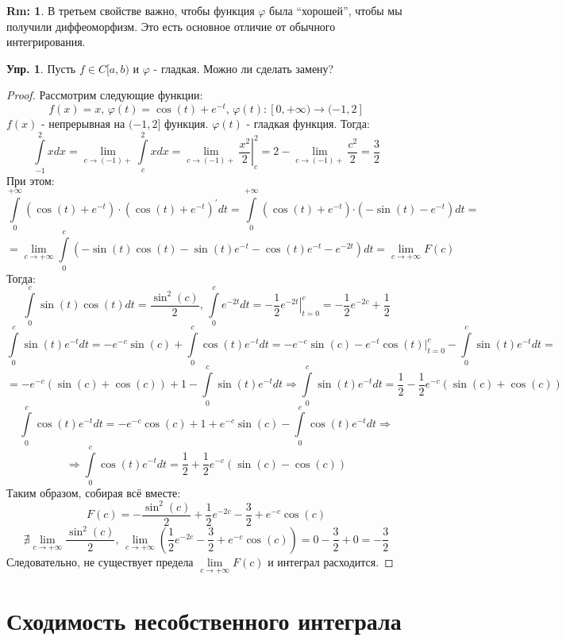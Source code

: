 \documentclass[12pt]{article}
\theoremstyle{definition}
\newtheorem{rem}{Rm:}
\newtheorem{exrc}{Упр.}
\newcommand{\ddint}[2]{\displaystyle\int\limits_{#1}^{#2}}
\begin{document}
\begin{rem}
	В третьем свойстве важно, чтобы функция $\varphi$ была ``хорошей'', чтобы мы получили диффеоморфизм. Это есть основное отличие от обычного интегрирования.
\end{rem}
\begin{exrc}
	Пусть $f \in C[a,b)$ и $\varphi$ - гладкая. Можно ли сделать замену?
\end{exrc}
\begin{proof}
	Рассмотрим следующие функции: 
	$$
		f(x) = x, \, \varphi(t) = \cos{(t)} + e^{-t}, \, \varphi(t) \colon [0,+\infty) \to (-1, 2]
	$$
	$f(x)$ - непрерывная на $(-1,2]$ функция. $\varphi(t)$ - гладкая функция. Тогда:
	$$
		\ddint{-1}{2}xdx = \lim\limits_{c \to (-1)+}\ddint{c}{2}xdx = \lim\limits_{c \to (-1)+}\left.\dfrac{x^2}{2}\right|_{c}^{2} = 2 - \lim\limits_{c \to (-1)+}\dfrac{c^2}{2} = \dfrac{3}{2}
	$$
	При этом:
	$$
		\ddint{0}{+\infty}(\cos{(t)} + e^{-t}){\cdot}(\cos{(t)} + e^{-t})^\prime dt = 	\ddint{0}{+\infty}(\cos{(t)} + e^{-t}){\cdot\!}\left(-\sin{(t)} - e^{-t}\right)dt =
	$$
	$$
		= \lim\limits_{c \to +\infty}\ddint{0}{c}(-\sin{(t)}\cos{(t)} -\sin{(t)}e^{-t} - \cos{(t)}e^{-t} - e^{-2t})dt = \lim\limits_{c\to +\infty}F(c)
	$$
	Тогда:
	$$
		\ddint{0}{c}\sin{(t)}\cos{(t)}dt = \dfrac{\sin^2{(c)}}{2},\, \ddint{0}{c}e^{-2t}dt = -\dfrac{1}{2}\left.e^{-2t}\right|_{t = 0}^{c} = -\dfrac{1}{2}e^{-2c} + \dfrac{1}{2}
	$$
	$$
		\ddint{0}{c}\sin{(t)}e^{-t}dt = -e^{-c}\sin{(c)} + \ddint{0}{c}\cos{(t)}e^{-t}dt = -e^{-c}\sin{(c)} - e^{-t}\left.\cos{(t)}\right|_{t = 0}^{c} - \ddint{0}{c}\sin{(t)}e^{-t}dt =
	$$
	$$
		= -e^{-c}\left(\sin{(c)} + \cos{(c)}\right) + 1 - \ddint{0}{c}\sin{(t)}e^{-t}dt \Rightarrow \ddint{0}{c}\sin{(t)}e^{-t}dt = \dfrac{1}{2} - \dfrac{1}{2}e^{-c}\left(\sin{(c)} + \cos{(c)}\right)
	$$
	$$
		\ddint{0}{c}\cos{(t)}e^{-t}dt = -e^{-c}\cos{(c)} + 1 + e^{-c}\sin{(c)} - \ddint{0}{c}\cos{(t)}e^{-t}dt \Rightarrow 
	$$
	$$
		\Rightarrow \ddint{0}{c}\cos{(t)}e^{-t}dt = \dfrac{1}{2} + \dfrac{1}{2}e^{-c}\left(\sin{(c)} - \cos{(c)}\right)
	$$
	Таким образом, собирая всё вместе:
	$$
		F(c) = -\dfrac{\sin^2{(c)}}{2} + \dfrac{1}{2}e^{-2c} - \dfrac{3}{2}  + e^{-c}\cos{(c)}
	$$
	$$
		\nexists \lim\limits_{c \to +\infty}\dfrac{\sin^2{(c)}}{2}, \, \lim\limits_{c \to +\infty} \left(\dfrac{1}{2}e^{-2c} - \dfrac{3}{2}  + e^{-c}\cos{(c)}\right) = 0 - \dfrac{3}{2} + 0 = -\dfrac{3}{2}
	$$
	Следовательно, не существует предела $\lim\limits_{c \to +\infty}F(c)$ и интеграл расходится.
\end{proof}


\newpage
\section*{Сходимость несобственного интеграла}
\end{document}
